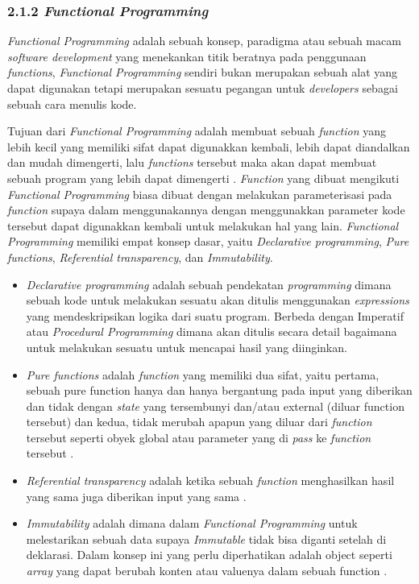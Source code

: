 \documentclass[a4paper]{article}
\newcommand{\subsubbab}[1]{%
    \subsubsection*{#1}%
    \addcontentsline{toc}{subsubsection}{\protect\numberline{}#1}%
}
\begin{document}
\subsubbab{2.1.2 \textit{Functional Programming}}
\textit{Functional Programming} adalah sebuah konsep, paradigma atau sebuah macam \textit{software development} yang menekankan titik beratnya pada penggunaan \textit{functions}, \textit{Functional Programming} sendiri bukan merupakan sebuah alat yang dapat digunakan tetapi merupakan sesuatu pegangan untuk \textit{developers} sebagai sebuah cara menulis kode\autocite{atencio2016functional}.


Tujuan dari \textit{Functional Programming} adalah membuat sebuah \textit{function} yang lebih kecil yang memiliki sifat dapat digunakkan kembali, lebih dapat diandalkan dan mudah dimengerti, lalu \textit{functions} tersebut maka akan dapat membuat sebuah program yang lebih dapat dimengerti \autocite{atencio2016functional}. \textit{Function} yang dibuat mengikuti \textit{Functional Programming} biasa dibuat dengan melakukan parameterisasi pada \textit{function} supaya dalam menggunakannya dengan menggunakkan parameter kode tersebut dapat digunakkan kembali untuk melakukan hal yang lain. \textit{Functional Programming} memiliki empat konsep dasar, yaitu \textit{Declarative programming}, \textit{Pure functions}, \textit{Referential transparency}, dan \textit{Immutability}\autocite{atencio2016functional}.


\begin{itemize}
    \item \textit{Declarative programming} adalah sebuah pendekatan \textit{programming} dimana sebuah kode untuk melakukan sesuatu akan ditulis menggunakan \textit{expressions} yang mendeskripsikan logika dari suatu program. Berbeda dengan Imperatif atau \textit{Procedural Programming} dimana akan ditulis secara detail bagaimana untuk melakukan sesuatu untuk mencapai hasil yang diinginkan\autocite{atencio2016functional}.
    \item \textit{Pure functions} adalah \textit{function} yang memiliki dua sifat, yaitu pertama, sebuah pure function hanya dan hanya bergantung pada input yang diberikan dan tidak dengan \textit{state} yang tersembunyi dan/atau external (diluar function tersebut) dan kedua, tidak merubah apapun yang diluar dari \textit{function} tersebut seperti obyek global atau parameter yang di \textit{pass} ke \textit{function} tersebut \autocite{atencio2016functional}.
    \item \textit{Referential transparency} adalah ketika sebuah \textit{function} menghasilkan hasil yang sama juga diberikan input yang sama \autocite{atencio2016functional}.
    \item \textit{Immutability} adalah dimana dalam \textit{Functional Programming} untuk melestarikan sebuah data supaya \textit{Immutable} tidak bisa diganti setelah di deklarasi. Dalam konsep ini yang perlu diperhatikan adalah object seperti \textit{array} yang dapat berubah konten atau valuenya dalam sebuah function \autocite{atencio2016functional}.
\end{itemize}
\end{document}
